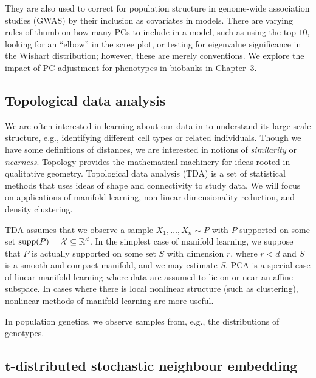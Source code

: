 They are also used to correct for population structure in genome-wide association studies (GWAS) by their inclusion as covariates in models\cite{price_principal_2006}. There are varying rules-of-thumb on how many PCs to include in a model, such as using the top $10$, looking for an ``elbow'' in the scree plot, or testing for eigenvalue significance in the Wishart distribution; however, these are merely conventions. We explore the impact of PC adjustment for phenotypes in biobanks in \hyperref[chap:chapter3]{Chapter~3}. 

\subsection{Topological data analysis}

We are often interested in learning about our data in to understand its large-scale structure, e.g., identifying different cell types or related individuals. Though we have some definitions of distances, we are interested in notions of \textit{similarity} or \textit{nearness}. Topology provides the mathematical machinery for ideas rooted in qualitative geometry\citep{carlsson_topology_2009}. Topological data analysis (TDA) is a set of statistical methods that uses ideas of shape and connectivity to study data\citep{wasserman_topological_2018}. We will focus on applications of manifold learning, non-linear dimensionality reduction, and density clustering.

TDA assumes that we observe a sample $X_1, \dots, X_n \sim P$ with $P$ supported on some set $\operatorname{supp}(P) = \mathcal{X} \subseteq \mathbb{R}^d$. 
In the simplest case of manifold learning, we suppose that $P$ is actually supported on some set $S$ with dimension $r$, where $r < d$ and $S$ is a smooth and compact manifold, and we may estimate $S$. PCA is a special case of linear manifold learning where data are assumed to lie on or near an affine subspace\citep{wasserman_topological_2018}. In cases where there is local nonlinear structure (such as clustering), nonlinear methods of manifold learning are more useful\cite{izenman_introduction_2012}.

In population genetics, we observe samples from, e.g., the distributions of genotypes.

\subsection{\texorpdfstring{$\mathbf{t}$}{f}-distributed stochastic neighbour embedding}

